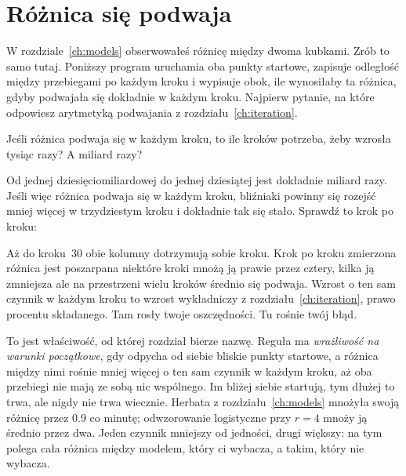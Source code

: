 
\section{Różnica się podwaja}
\label{sec:ch06-gap}

\noindent
W rozdziale~\ref{ch:models} obserwowałeś różnicę między dwoma kubkami. Zrób
to samo tutaj. Poniższy program uruchamia oba punkty startowe, zapisuje
odległość między przebiegami po każdym kroku i wypisuje obok, ile
wynosiłaby ta różnica, gdyby podwajała się dokładnie w każdym kroku.
Najpierw pytanie, na które odpowiesz arytmetyką podwajania
z rozdziału~\ref{ch:iteration}.

\begin{think}
Jeśli różnica podwaja się w każdym kroku, to ile kroków potrzeba, żeby
wzrosła tysiąc razy? A miliard razy?
\end{think}
Od jednej dziesięciomiliardowej do jednej dziesiątej jest dokładnie miliard
razy. Jeśli więc różnica podwaja się w każdym kroku, bliźniaki powinny się
rozejść mniej więcej w trzydziestym kroku i dokładnie tak się stało.
Sprawdź to krok po kroku:



\noindent
Aż do kroku~30 obie kolumny dotrzymują sobie kroku. Krok po kroku zmierzona
różnica jest poszarpana \dash{} niektóre kroki mnożą ją prawie przez cztery,
kilka ją zmniejsza \dash{} ale na przestrzeni wielu kroków średnio się
podwaja. Wzrost o ten sam czynnik w każdym kroku to wzrost wykładniczy z
rozdziału~\ref{ch:iteration}, prawo procentu składanego. Tam rosły twoje
oszczędności. Tu rośnie twój błąd.

To jest właściwość, od której rozdział bierze nazwę. Reguła ma
\emph{wrażliwość na warunki początkowe}, gdy odpycha od siebie bliskie
punkty startowe, a różnica między nimi rośnie mniej więcej o ten sam czynnik
w każdym kroku, aż oba przebiegi nie mają ze sobą nic wspólnego. Im bliżej
siebie startują, tym dłużej to trwa, ale nigdy nie trwa wiecznie. Herbata z
rozdziału~\ref{ch:models} mnożyła swoją różnicę przez \num{0.9} co minutę;
odwzorowanie logistyczne przy $r = 4$ mnoży ją średnio przez dwa. Jeden
czynnik mniejszy od jedności, drugi większy: na tym polega cała różnica
między modelem, który ci wybacza, a takim, który nie wybacza.

